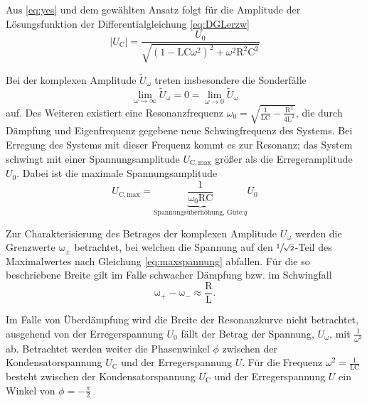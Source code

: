 Aus \eqref{eq:yes} und dem gewählten Ansatz folgt für die Amplitude der Lösungsfunktion der Differentialgleichung \eqref{eq:DGLerzw}
\begin{equation}
	|U_\mathup{C}| = \frac{U_0}{\sqrt{(1 − \mathup{LC}\omega^2)^2 +ω^2\mathup{R^2C^2}}} 
\end{equation}

Bei der komplexen Amplitude $\tilde{U}_\mathup{\omega}$ treten insbesondere die Sonderfälle
\begin{equation}
 	\lim_{\omega\to\infty} \tilde{U}_\mathup{\omega} =0 =\lim_{\omega\to 0} \tilde{U}_\mathup{\omega} 
\end{equation} auf.
Des Weiteren existiert eine Resonanzfrequenz $\omega_0 = \sqrt{\frac{1}{\mathup{LC}}-\frac{\mathup{R^2}}{4\mathup{L^2}}}$, die durch Dämpfung und Eigenfrequenz gegebene neue Schwingfrequenz des Systems.
Bei Erregung des Systems mit dieser Frequenz kommt es zur Resonanz; das System schwingt mit einer Spannungsamplitude $U_\mathup{C,max}$ größer als die Erregeramplitude $U_0$.
Dabei ist die maximale Spannungsamplitude
\begin{equation}
	U_\mathup{C,max}= \underbrace{\frac{1}{\mathup{\omega_0RC}}}_{\text{Spannungsüberhöhung, Güte:} q} U_0 
	\label{eq:maxspannung}
\end{equation}

Zur Charakterisierung des Betrages der komplexen Amplitude $U_\mathup{\omega}$ werden die Grenzwerte $\mathup{\omega_\pm}$ betrachtet, bei welchen die Spannung auf den $\sfrac{1}{\sqrt{2}}$-Teil des Maximalwertes nach Gleichung \eqref{eq:maxspannung} abfallen.  
Für die so beschriebene Breite gilt im Falle schwacher Dämpfung bzw. im Schwingfall
\begin{equation}
	\mathup{ω_+} − \mathup{ω_−} \approx \frac{\mathup{R}}{\mathup{L}}.
\end{equation}

Im Falle von Überdämpfung wird die Breite der Resonanzkurve nicht betrachtet, ausgehend von der  Erregerspannung $U_0$ fällt der Betrag der Spannung, $U_\mathup{\omega}$,  mit $\frac{1}{\omega^2}$ ab.
Betrachtet werden weiter die Phasenwinkel $\phi$ zwischen der Kondensatorspannung $U_\mathup{C}$ und der Erregerspannung $U$.
Für die Frequenz $\omega^2 = \frac{1}{\mathup{LC}}$ besteht zwischen der Kondensatorspannung $U_\mathup{C}$ und der Erregerspannung $U$ ein Winkel von $\phi =-\frac{\pi}{2}$


